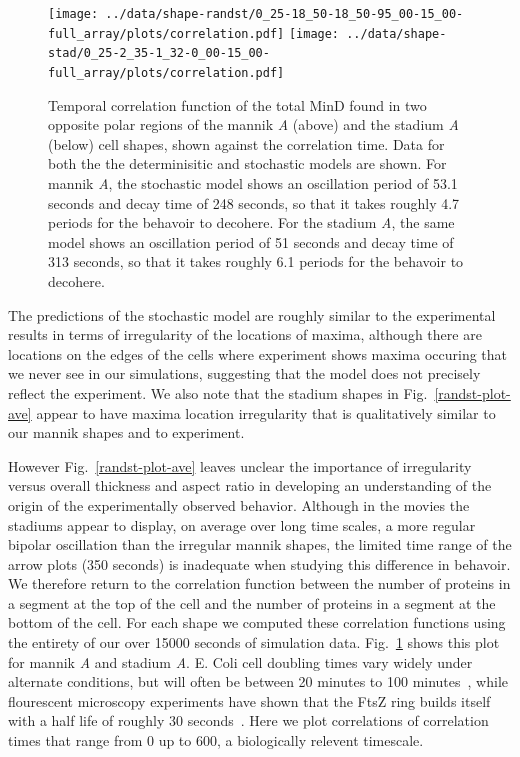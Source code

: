 \documentclass[letterpaper,twocolumn,amsmath,amssymb,pre]{revtex4-1}
\begin{document}
\begin{figure}
  \texttt{[image: ../data/shape-randst/0\_25-18\_50-18\_50-95\_00-15\_00-full\_array/plots/correlation.pdf]}
  \texttt{[image: ../data/shape-stad/0\_25-2\_35-1\_32-0\_00-15\_00-full\_array/plots/correlation.pdf]}
  \caption{Temporal correlation function of the total MinD found in
    two opposite polar regions of the mannik \emph{A} (above) and the
    stadium \emph{A} (below) cell shapes, shown against the
    correlation time.  Data for both the the determinisitic and
    stochastic models are shown.  For mannik \emph{A}, the stochastic
    model shows an oscillation period of 53.1 seconds and decay time
    of 248 seconds, so that it takes roughly 4.7 periods for the
    behavoir to decohere.  For the stadium \emph{A}, the same model
    shows an oscillation period of 51 seconds and decay time of 313
    seconds, so that it takes roughly 6.1 periods for the behavoir to
    decohere.}
  \label{fig:corr-pancake-A}
\end{figure}

The predictions of the stochastic model are roughly similar to the
experimental results in terms of irregularity of the locations of
maxima, although there are locations on the edges of the cells where
experiment shows maxima occuring that we never see in our simulations,
suggesting that the model does not precisely reflect the experiment.
We also note that the stadium shapes in Fig.~\ref{randst-plot-ave}
appear to have maxima location irregularity that is qualitatively
similar to our mannik shapes and to experiment.

However Fig.~\ref{randst-plot-ave} leaves unclear the importance of
irregularity versus overall thickness and aspect ratio in developing
an understanding of the origin of the experimentally observed
behavior.  Although in the movies the stadiums appear to display, on
average over long time scales, a more regular bipolar oscillation than
the irregular mannik shapes, the limited time range of the arrow plots
(350 seconds) is inadequate when studying this difference in behavoir.
We therefore return to the correlation function between the number of
proteins in a segment at the top of the cell and the number of
proteins in a segment at the bottom of the cell.  For each shape we
computed these correlation functions using the entirety of our over
15000 seconds of simulation data. Fig.~\ref{fig:corr-pancake-A} shows
this plot for mannik \emph{A} and stadium \emph{A}.  E. Coli cell
doubling times vary widely under alternate conditions, but will often
be between 20 minutes to 100 minutes~\cite{pierucci1972chromosome},
while flourescent microscopy experiments have shown that the FtsZ ring
builds itself with a half life of roughly 30
seconds~\cite{stricker2002rapid}.  Here we plot correlations of
correlation times that range from 0 up to 600, a biologically relevent
timescale.
\end{document}
